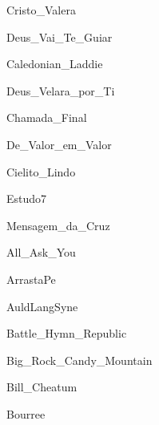 \documentclass{scrartcl}
\begin{document}

{Cristo_Valera}


{Deus_Vai_Te_Guiar}


{Caledonian_Laddie}


{Deus_Velara_por_Ti}


{Chamada_Final}


{De_Valor_em_Valor}


{Cielito_Lindo}


{Estudo7}


{Mensagem_da_Cruz}


{All_Ask_You}


{ArrastaPe}


{AuldLangSyne}


{Battle_Hymn_Republic}


{Big_Rock_Candy_Mountain}


{Bill_Cheatum}


{Bourree}
\end{document}
